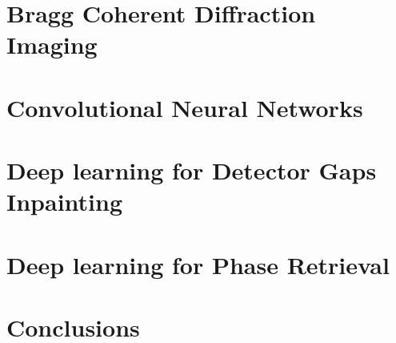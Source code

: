 \documentclass[12pt]{book}
\begin{document}




\mainmatter 
\fancyhead[RO]{\leftmark}
\fancyhead[LE]{\textsc{\chaptername~\thechapter}}

\part{Bragg Coherent Diffraction Imaging}\label{part:bcdi}


\part{Convolutional Neural Networks}\label{part:theory_background}


\part{Deep learning for Detector Gaps Inpainting}\label{part:study}


\part{Deep learning for Phase Retrieval}\label{part:study}


\part{Conclusions}\label{part:study}

%


% 
\printbibliography
{}

\begin{appendices}%
\appendixheaderon
\label{part:annexe}

\end{appendices}
\end{document}
